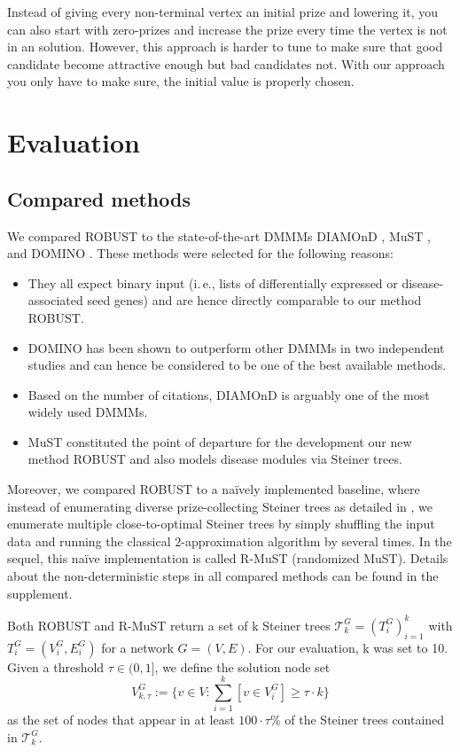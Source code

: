 \documentclass{bioinfo}
\makeatletter
\newcommand{\ie}{i.\,e.\@\xspace}
\makeatother
\begin{document}
Instead of giving every non-terminal vertex an initial prize and lowering it, you can also start with zero-prizes and increase the prize every time the vertex is not in an solution.
However, this approach is harder to tune to make sure that good candidate become attractive enough but bad candidates not.
With our approach you only have to make sure, the initial value is properly chosen.

\section{Evaluation}

\subsection{Compared methods}

We compared ROBUST to the state-of-the-art DMMMs DIAMOnD \citep{diamond_ghiassian2015}, MuST \citep{covex_sadegh2020}, and DOMINO \citep{domino_levi2021}. These methods were selected for the following reasons: 
\begin{itemize}
\item They all expect binary input (\ie, lists of differentially expressed or disease-associated seed genes) and are hence directly comparable to our method ROBUST.
\item DOMINO has been shown to outperform other DMMMs in two independent studies \citep{domino_levi2021,amim_lazareva2021} and can hence be considered to be one of the best available methods.
\item Based on the number of citations, DIAMOnD is arguably one of the most widely used DMMMs.
\item MuST constituted the point of departure for the development our new method ROBUST and also models disease modules via Steiner trees.
\end{itemize}

Moreover, we compared ROBUST to a na\"ively implemented baseline, where instead of enumerating diverse prize-collecting Steiner trees as detailed in , we enumerate multiple close-to-optimal Steiner trees by simply shuffling the input data and running the classical $2$-approximation algorithm by \cite{kou:1981aa} several times. In the sequel, this na\"ive implementation is called R-MuST (randomized MuST). Details about the non-deterministic steps in all compared methods can be found in the supplement. 

Both ROBUST and R-MuST return a set of k Steiner trees $\mathcal{T}_k^G = (T_i^G)_{i=1}^k$ with $T_i^G=(V_i^G, E_i^G)$ for a network $G=(V,E)$. For our evaluation, k was set to 10. Given a threshold $\tau \in (0,1]$, we define the solution node set \begin{equation}
    V_{k, \tau}^G := \bigg\{ v \in V: \sum_{i=1}^k[v \in V_i^G] \geq \tau \cdot k \bigg\}
\end{equation}
as the set of nodes that appear in at least $100 \cdot \tau \%$ of the Steiner trees contained in $\mathcal{T}_k^G$.  
\end{document}
